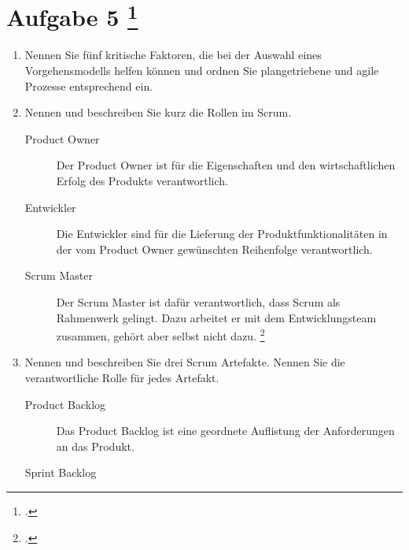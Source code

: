 \documentclass{lehramt-informatik-aufgabe}
\begin{document}
\section{Aufgabe 5
\footcite{66116:2020:09}}

\begin{enumerate}

%

\item Nennen Sie fünf kritische Faktoren, die bei der Auswahl eines
Vorgehensmodells helfen können und ordnen Sie plangetriebene und agile
Prozesse entsprechend ein.

%

\item Nennen und beschreiben Sie kurz die Rollen im Scrum.

\begin{liAntwort}
\begin{description}
\item[Product Owner]

Der Product Owner ist für die Eigenschaften und den wirtschaftlichen
Erfolg des Produkts verantwortlich.

\item[Entwickler]
Die Entwickler sind für die Lieferung der Produktfunktionalitäten in der
vom Product Owner gewünschten Reihenfolge verantwortlich.

\item[Scrum Master]

Der Scrum Master ist dafür verantwortlich, dass Scrum als Rahmenwerk
gelingt. Dazu arbeitet er mit dem Entwicklungsteam zusammen, gehört aber
selbst nicht dazu.
\footcite{wiki:scrum}
\end{description}
\end{liAntwort}

%

\item Nennen und beschreiben Sie drei Scrum Artefakte. Nennen Sie die
verantwortliche Rolle für jedes Artefakt.

\begin{liAntwort}
\begin{description}
\item[Product Backlog]

Das Product Backlog ist eine geordnete Auflistung der Anforderungen an
das Produkt.

\item[Sprint Backlog]


\end{description}
\end{liAntwort}
\end{enumerate}
\end{document}
